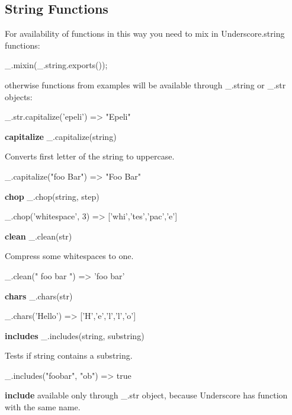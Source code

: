 \subsection*{String Functions}

For availability of functions in this way you need to mix in Underscore.\+string functions\+:


\begin{DoxyCode}
\_.mixin(\_.string.exports());
\end{DoxyCode}


otherwise functions from examples will be available through \+\_\+.\+string or \+\_\+.\+str objects\+:


\begin{DoxyCode}
\_.str.capitalize('epeli')
=> "Epeli"
\end{DoxyCode}


{\bfseries capitalize} \+\_\+.\+capitalize(string)

Converts first letter of the string to uppercase.


\begin{DoxyCode}
\_.capitalize("foo Bar")
=> "Foo Bar"
\end{DoxyCode}


{\bfseries chop} \+\_\+.\+chop(string, step)


\begin{DoxyCode}
\_.chop('whitespace', 3)
=> ['whi','tes','pac','e']
\end{DoxyCode}


{\bfseries clean} \+\_\+.\+clean(str)

Compress some whitespaces to one.


\begin{DoxyCode}
\_.clean(" foo    bar   ")
=> 'foo bar'
\end{DoxyCode}


{\bfseries chars} \+\_\+.\+chars(str)


\begin{DoxyCode}
\_.chars('Hello')
=> ['H','e','l','l','o']
\end{DoxyCode}


{\bfseries includes} \+\_\+.\+includes(string, substring)

Tests if string contains a substring.


\begin{DoxyCode}
\_.includes("foobar", "ob")
=> true
\end{DoxyCode}


{\bfseries include} available only through \+\_\+.\+str object, because Underscore has function with the same name.


